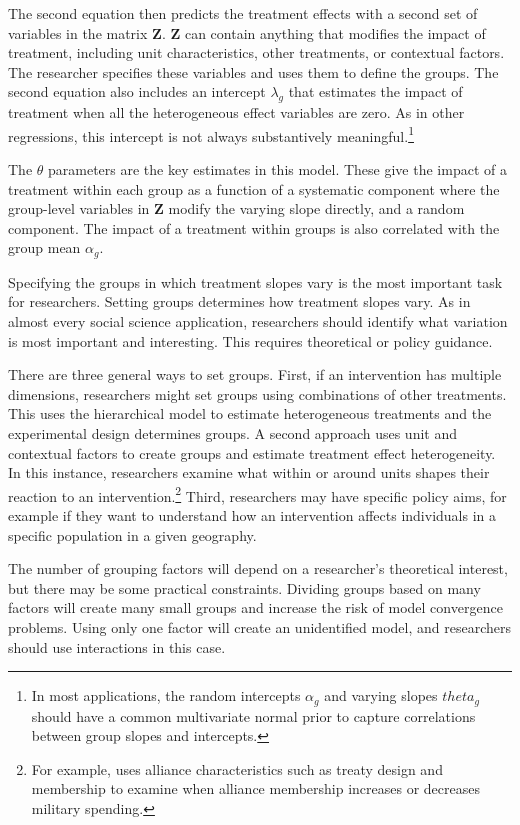 \documentclass[12pt]{article}
\begin{document}
The second equation then predicts the treatment effects with a second set of variables in the matrix \textbf{Z}. 
\textbf{Z} can contain anything that modifies the impact of treatment, including unit characteristics, other treatments, or contextual factors. 
The researcher specifies these variables and uses them to define the groups. 
The second equation also includes an intercept $\lambda_g$ that estimates the impact of treatment when all the heterogeneous effect variables are zero.
As in other regressions, this intercept is not always substantively meaningful.\footnote{In most applications, the random intercepts $\alpha_g$ and varying slopes $theta_g$ should have a common multivariate normal prior to capture correlations between group slopes and intercepts.}


The $\theta$ parameters are the key estimates in this model.
These give the impact of a treatment within each group as a function of a systematic component where the group-level variables in \textbf{Z} modify the varying slope directly, and a random component. 
The impact of a treatment within groups is also correlated with the group mean $\alpha_g$.  


Specifying the groups in which treatment slopes vary is the most important task for researchers. 
Setting groups determines how treatment slopes vary.
As in almost every social science application, researchers should identify what variation is most important and interesting. 
This requires theoretical or policy guidance. 


There are three general ways to set groups.
First, if an intervention has multiple dimensions, researchers might set groups using combinations of other treatments.
This uses the hierarchical model to estimate heterogeneous treatments and the experimental design determines groups. 
A second approach uses unit and contextual factors to create groups and estimate treatment effect heterogeneity. 
In this instance, researchers examine what within or around units shapes their reaction to an intervention.\footnote{For example, \citet{Alley2021isq} uses alliance characteristics such as treaty design and membership to examine when alliance membership increases or decreases military spending.} 
Third, researchers may have specific policy aims, for example if they want to understand how an intervention affects individuals in a specific population in a given geography. 


The number of grouping factors will depend on a researcher's theoretical interest, but there may be some practical constraints. 
Dividing groups based on many factors will create many small groups and increase the risk of model convergence problems. 
Using only one factor will create an unidentified model, and researchers should use interactions in this case. 
\end{document}
